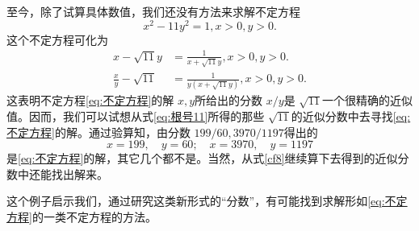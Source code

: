 \begin{example}
	至今，除了试算具体数值，我们还没有方法来求解不定方程
	\begin{equation}
		x^2 - 11y^2 = 1, x > 0, y > 0. \label{eq:不定方程}
	\end{equation}
	这个不定方程可化为
	\begin{align}
		x - \sqrt{11}y          & = \frac{1}{x + \sqrt{11}y}, x > 0, y > 0. \nonumber \\
		\frac{x}{y} - \sqrt{11} & = \frac{1}{y(x + \sqrt{11}y)}, x > 0, y > 0.
	\end{align}
	这表明不定方程\eqref{eq:不定方程}的解 \( x, y \)所给出的分数 \( x/y \)是 \( \sqrt{11}
	\)一个很精确的近似值。因而，我们可以试想从式\eqref{eq:根号11}所得的那些 \( \sqrt{11}
	\)的近似分数中去寻找\eqref{eq:不定方程}的解。通过验算知，由分数 \( 199/60, 3970/1197 \)得出的
	\begin{equation}
		x=199,\quad y=60; \quad x=3970, \quad y=1197
	\end{equation}
	是\eqref{eq:不定方程}的解，其它几个都不是。当然，从式\eqref{cf8}继续算下去得到的近似分数中还能找出解来。

	这个例子启示我们，通过研究这类新形式的\enquote{分数}，有可能找到求解形如\eqref{eq:不定方程}的一类不定方程的方法。
\end{example}
